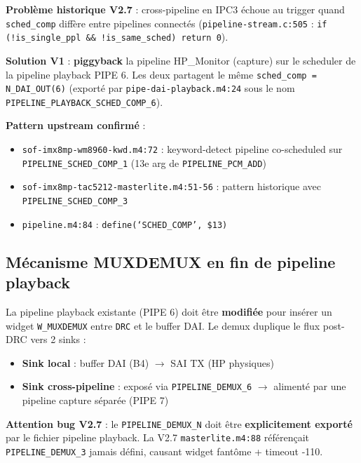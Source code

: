 \documentclass[11pt,a4paper]{article}
\begin{document}
\textbf{Problème historique V2.7} : cross-pipeline en IPC3 échoue au trigger quand \texttt{sched\_comp} diffère entre pipelines connectés (\texttt{pipeline-stream.c:505} : \texttt{if (!is\_single\_ppl \&\& !is\_same\_sched) return 0}).

\textbf{Solution V1} : \textbf{piggyback} la pipeline HP\_Monitor (capture) sur le scheduler de la pipeline playback PIPE 6. Les deux partagent le même \texttt{sched\_comp = N\_DAI\_OUT(6)} (exporté par \texttt{pipe-dai-playback.m4:24} sous le nom \texttt{PIPELINE\_PLAYBACK\_SCHED\_COMP\_6}).

\textbf{Pattern upstream confirmé} :
\begin{itemize}[leftmargin=*, itemsep=1pt]
  \item \texttt{sof-imx8mp-wm8960-kwd.m4:72} : keyword-detect pipeline co-scheduled sur \texttt{PIPELINE\_SCHED\_COMP\_1} (13e arg de \texttt{PIPELINE\_PCM\_ADD})
  \item \texttt{sof-imx8mp-tac5212-masterlite.m4:51-56} : pattern historique avec \texttt{PIPELINE\_SCHED\_COMP\_3}
  \item \texttt{pipeline.m4:84} : \texttt{define(`SCHED\_COMP', \$13)}
\end{itemize}

\subsection{Mécanisme MUXDEMUX en fin de pipeline playback}

La pipeline playback existante (PIPE 6) doit être \textbf{modifiée} pour insérer un widget \texttt{W\_MUXDEMUX} entre \texttt{DRC} et le buffer DAI. Le demux duplique le flux post-DRC vers 2 sinks :
\begin{itemize}[leftmargin=*, itemsep=1pt]
  \item \textbf{Sink local} : buffer DAI (B4) $\to$ SAI TX (HP physiques)
  \item \textbf{Sink cross-pipeline} : exposé via \texttt{PIPELINE\_DEMUX\_6} $\to$ alimenté par une pipeline capture séparée (PIPE 7)
\end{itemize}

\textbf{Attention bug V2.7} : le \texttt{PIPELINE\_DEMUX\_N} doit être \textbf{explicitement exporté} par le fichier pipeline playback. La V2.7 \texttt{masterlite.m4:88} référençait \texttt{PIPELINE\_DEMUX\_3} jamais défini, causant widget fantôme + timeout -110.

\end{document}
